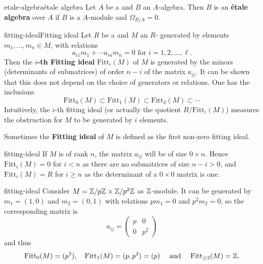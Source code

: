 \begin{topic}{etale-algebra}{étale algebra}
    Let $A$ be a  and $B$ an $A$-algebra. Then $B$ is an \textbf{étale algebra} over $A$ if $B$ is a  $A$-module and $\Omega_{B/A} = 0$.
\end{topic}

\begin{topic}{fitting-ideal}{Fitting ideal}
    Let $R$ be a  and $M$ an $R$- generated by elements $m_1, \ldots, m_n \in M$, with relations
    \[ a_{i1} m_1 + \cdots a_{in} m_n = 0 \text{ for } i = 1, 2, \ldots, \ell . \]
    Then the \textbf{$i$-th Fitting ideal} $\text{Fitt}_i(M)$ of $M$ is generated by the minors (determinants of submatrices) of order $n - i$ of the matrix $a_{ij}$. It can be shown that this does not depend on the choice of generators or relations. One has the inclusions
    \[ \text{Fitt}_0(M) \subset \text{Fitt}_1(M) \subset \text{Fitt}_2(M) \subset \cdots \]
    Intuitively, the $i$-th fitting ideal (or actually the quotient $R / \text{Fitt}_i(M)$) measures the obstruction for $M$ to be generated by $i$ elements.
    
    Sometimes the \textbf{Fitting ideal} of $M$ is defined as the first non-zero fitting ideal.
\end{topic}

\begin{example}{fitting-ideal}
    If $M$ is  of rank $n$, the matrix $a_{ij}$ will be of size $0 \times n$. Hence $\text{Fitt}_i(M) = 0$ for $i < n$ as there are no submatrices of size $n - i > 0$, and $\text{Fitt}_i(M) = R$ for $i \ge n$ as the determinant of a $0 \times 0$ matrix is one.
\end{example}

\begin{example}{fitting-ideal}
    Consider $M = \mathbb{Z} / p \mathbb{Z} \times \mathbb{Z} / p^2 \mathbb{Z}$ as $\mathbb{Z}$-module. It can be generated by $m_1 = (1, 0)$ and $m_2 = (0, 1)$ with relations $p m_1 = 0$ and $p^2 m_2 = 0$, so the corresponding matrix is
    \[ a_{ij} = \begin{pmatrix} p & 0 \\ 0 & p^2 \end{pmatrix} \]
    and thus
    \[ \text{Fitt}_0(M) = (p^3), \quad \text{Fitt}_1(M) = (p, p^2) = (p) \quad \text{ and } \quad \text{Fitt}_{\ge 2}(M) = \mathbb{Z} . \]
\end{example}

